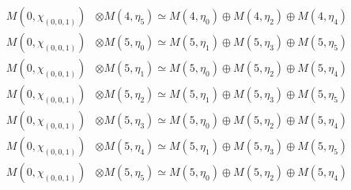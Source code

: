 \begin{align*}
M(0,\chi_{(0,0,1)}) &\otimes M(4,\eta_{5}) \simeq M(4,\eta_{0}) \oplus M(4,\eta_{2}) \oplus M(4,\eta_{4}) \\
M(0,\chi_{(0,0,1)}) &\otimes M(5,\eta_{0}) \simeq M(5,\eta_{1}) \oplus M(5,\eta_{3}) \oplus M(5,\eta_{5}) \\
M(0,\chi_{(0,0,1)}) &\otimes M(5,\eta_{1}) \simeq M(5,\eta_{0}) \oplus M(5,\eta_{2}) \oplus M(5,\eta_{4}) \\
M(0,\chi_{(0,0,1)}) &\otimes M(5,\eta_{2}) \simeq M(5,\eta_{1}) \oplus M(5,\eta_{3}) \oplus M(5,\eta_{5}) \\
M(0,\chi_{(0,0,1)}) &\otimes M(5,\eta_{3}) \simeq M(5,\eta_{0}) \oplus M(5,\eta_{2}) \oplus M(5,\eta_{4}) \\
M(0,\chi_{(0,0,1)}) &\otimes M(5,\eta_{4}) \simeq M(5,\eta_{1}) \oplus M(5,\eta_{3}) \oplus M(5,\eta_{5}) \\
M(0,\chi_{(0,0,1)}) &\otimes M(5,\eta_{5}) \simeq M(5,\eta_{0}) \oplus M(5,\eta_{2}) \oplus M(5,\eta_{4}) \\
\end{align*}


